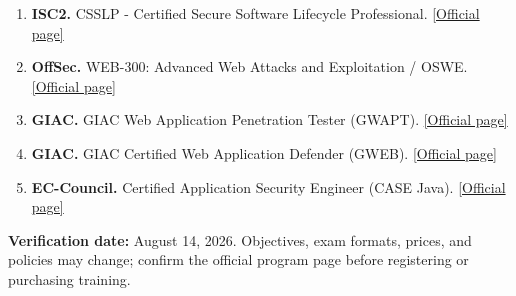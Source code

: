 \documentclass[11pt]{article}
\newcommand{\sourceitem}[3]{\item \textbf{#1.} #2. \href{#3}{\color{Blue}[Official page]}}
\begin{document}
\begin{enumerate}[leftmargin=1.6em,itemsep=5pt]
  \sourceitem{ISC2}{CSSLP - Certified Secure Software Lifecycle Professional}{https://www.isc2.org/certifications/csslp}
  \sourceitem{OffSec}{WEB-300: Advanced Web Attacks and Exploitation / OSWE}{https://www.offsec.com/courses/web-300/}
  \sourceitem{GIAC}{GIAC Web Application Penetration Tester (GWAPT)}{https://www.giac.org/certifications/web-application-penetration-tester-gwapt}
  \sourceitem{GIAC}{GIAC Certified Web Application Defender (GWEB)}{https://www.giac.org/certifications/certified-web-application-defender-gweb}
  \sourceitem{EC-Council}{Certified Application Security Engineer (CASE Java)}{https://www.eccouncil.org/train-certify/certified-application-security-engineer-case-java/}
\end{enumerate}

\vspace{4pt}
{\small\color{Muted}
\textbf{Verification date:} August 14, 2026. Objectives, exam formats, prices,
and policies may change; confirm the official program page before registering or
purchasing training.}
\end{document}
